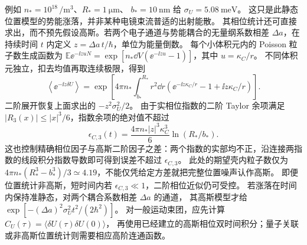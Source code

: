 \begin{exbox}[静态库仑涨落必须包含空间积分]
例如 $n_*=10^{18}\,\si{\per\metre\cubed}$、$R_*=\SI{1}{\micro\metre}$、
$b_*=\SI{10}{\nano\metre}$ 给 $\sigma_U=\SI{5.08}{\milli\electronvolt}$。
这只是此静态位置模型的势能涨落，并非某种电镜束流普适的出射能散。
其相位统计还可直接求出，而不预先假设高斯。若两个电子通道与势能耦合的无量纲系数相差 $\Delta a$，在持续时间 $t$ 内定义 $z=\Delta a\,t/\hbar$，单位为能量倒数。
每个小体积元内的 Poisson 粒子数生成函数为
$\mathbb E \ee^{-\ii z u N}=\exp[n_*\dd V(\ee^{-\ii zu}-1)]$，其中 $u=\kappa_C/r$。
不同体积元独立，扣去均值再取连续极限，得到
\begin{equation}
 \left\langle \ee^{-\ii z\delta U}\right\rangle
 =\exp\!\left[4\pi n_*\int_{b_*}^{R_*}r^2\dd r
 \left(\ee^{-\ii z\kappa_C/r}-1+\ii z\kappa_C/r\right)\right].
 \label{eq:feqo-poisson-coulomb-characteristic}
\end{equation}
二阶展开恢复上面求出的 $-z^2\sigma_U^2/2$。
由于实相位指数的二阶 Taylor 余项满足 $|R_3(x)|\le|x|^3/6$，指数余项的绝对值不超过
\[
 \epsilon_{C,3}(t)=\frac{4\pi n_*|z|^3\kappa_C^3}{6}\ln(R_*/b_*).
\]
这也控制精确相位因子与高斯二阶因子之差：两个指数的实部均不正，沿连接两指数的线段积分指数导数即可得到误差不超过 $\epsilon_{C,3}$。
此处的期望壳内粒子数仅为
$4\pi n_*(R_*^3-b_*^3)/3\simeq4.19$，不能仅凭给定方差就把完整位置噪声认作高斯。
即便位置统计非高斯，短时间内若 $\epsilon_{C,3}\ll1$，二阶相位近似仍可受控。
若涨落在时间内保持准静态，对两个耦合系数相差 $\Delta a$ 的通道，
其高斯模型才给 $\exp[-(\Delta a)^2\sigma_U^2t^2/(2\hbar^2)]$。
对一般运动束团，应先计算 $C_U(\tau)=\langle\delta U(\tau)\delta U(0)\rangle$，
再使用已经建立的高斯相位双时间积分；量子关联或非高斯位置统计则需要相应高阶连通函数。
\end{exbox}
